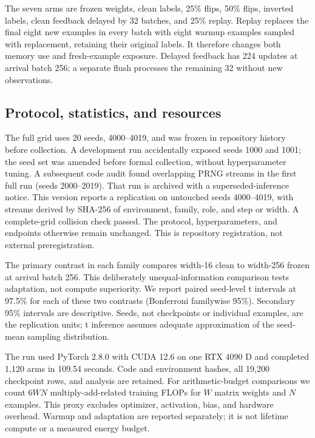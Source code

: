 \documentclass[11pt]{article}
\begin{document}
The seven arms are frozen weights, clean labels, 25\% flips, 50\% flips,
inverted labels, clean feedback delayed by 32 batches, and 25\% replay.
Replay replaces the final eight new examples in every batch with eight
warmup examples sampled with replacement, retaining their original labels.
It therefore changes both memory use and fresh-example exposure. Delayed
feedback has 224 updates at arrival batch 256; a separate flush processes
the remaining 32 without new observations.

\subsection{Protocol, statistics, and resources}
The full grid uses 20 seeds, 4000--4019, and was frozen in repository history
before collection. A development run accidentally exposed seeds 1000 and 1001;
the seed set was amended before formal collection, without hyperparameter
tuning. A subsequent code audit found overlapping PRNG streams in the first
full run (seeds 2000--2019). That run is archived with a superseded-inference
notice. This version reports a replication on untouched seeds 4000--4019,
with streams derived by SHA-256 of environment, family, role, and step or
width. A complete-grid collision check passed. The protocol, hyperparameters,
and endpoints otherwise remain unchanged. This is repository registration,
not external preregistration.

The primary contrast in each family compares width-16 clean to width-256
frozen at arrival batch 256. This deliberately unequal-information comparison
tests adaptation, not compute superiority. We report paired seed-level t
intervals at 97.5\% for each of these two contrasts (Bonferroni familywise
95\%). Secondary 95\% intervals are descriptive. Seeds, not checkpoints or
individual examples, are the replication units; t inference assumes adequate
approximation of the seed-mean sampling distribution.

The run used PyTorch 2.8.0 with CUDA 12.6 on one RTX 4090 D and completed
1,120 arms in 109.54 seconds. Code and environment hashes, all 19,200
checkpoint rows, and analysis are retained. For arithmetic-budget comparisons
we count $6WN$ multiply-add-related training FLOPs for $W$ matrix weights
and $N$ examples. This proxy excludes optimizer, activation, bias, and hardware
overhead. Warmup and adaptation are reported separately; it is not lifetime
compute or a measured energy budget.
\end{document}
